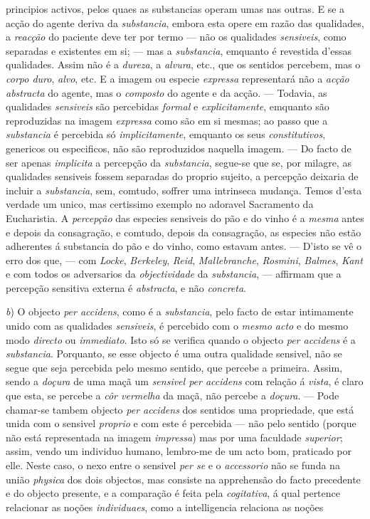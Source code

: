 principios activos, pelos quaes as substancias operam umas nas outras. E se a acção do agente deriva da \emph{substancia}, embora esta opere em razão das qualidades, a \emph{reacção} do paciente deve ter por termo --- não os qualidades \emph{sensiveis}, como separadas e existentes em si; --- mas a \emph{substancia}, emquanto é revestida d'essas qualidades. Assim não é a \emph{dureza}, a \emph{alvura}, etc., que os sentidos percebem, mas o \emph{corpo duro}, \emph{alvo}, etc. E a imagem ou especie \emph{expressa} representará não a \emph{acção abstracta} do agente, mas o \emph{composto} do agente e da acção. --- Todavia, as qualidades \emph{sensiveis} são percebidas \emph{formal} e \emph{explicitamente}, emquanto são reproduzidas na imagem \emph{expressa} como são em si mesmas; ao passo que a \emph{substancia} é percebida só \emph{implicitamente}, emquanto os seus \emph{constitutivos}, genericos ou especificos, não são reproduzidos naquella imagem. --- Do facto de ser apenas \emph{implicita} a percepção da \emph{substancia}, segue-se que se, por milagre, as qualidades sensiveis fossem separadas do proprio sujeito, a percepção deixaria de incluir a \emph{substancia}, sem, comtudo, soffrer uma intrinseca mudança. Temos d'esta verdade um unico, mas certissimo exemplo no adoravel Sacramento da Eucharistia. A \emph{percepção} das especies sensiveis do pão e do vinho é a \emph{mesma} antes e depois da consagração, e comtudo, depois da consagração, as especies não estão adherentes á substancia do pão e do vinho, como estavam antes. --- D'isto se vê o erro dos que, --- com \emph{Locke}, \emph{Berkeley}, \emph{Reid}, \emph{Mallebranche}, \emph{Rosmini}, \emph{Balmes}, \emph{Kant} e com todos os adversarios da \emph{objectividade} da \emph{substancia}, --- affirmam que a percepção sensitiva externa é \emph{abstracta}, e não \emph{concreta}.\par \emph{b}) O objecto \emph{per accidens}, como é a \emph{substancia}, pelo facto de estar intimamente unido com as qualidades \emph{sensiveis}, é percebido com o \emph{mesmo acto} e do mesmo modo \emph{directo} ou \emph{immediato}. Isto só se verifica quando o objecto \emph{per accidens} é a \emph{substancia}. Porquanto, se esse objecto é uma outra qualidade sensivel, não se segue que seja percebida pelo mesmo sentido, que percebe a primeira. Assim, sendo a \emph{doçura} de uma maçã um \emph{sensivel per accidens} com relação á \emph{vista}, é claro que esta, se percebe a \emph{côr vermelha} da maçã, não percebe a \emph{doçura}. --- Pode chamar-se tambem objecto \emph{per accidens} dos sentidos uma propriedade, que está unida com o sensivel \emph{proprio} e com este é percebida --- não pelo sentido (porque não está representada na imagem \emph{impressa}) mas por uma faculdade \emph{superior}; assim, vendo um individuo humano, lembro-me de um acto bom, praticado por elle. Neste caso, o nexo entre o sensivel \emph{per se} e o \emph{accessorio} não se funda na união \emph{physica} dos dois objectos, mas consiste na apprehensão do facto precedente e do objecto presente, e a comparação é feita pela \emph{cogitativa}, á qual pertence relacionar as noções \emph{individuaes}, como a intelligencia relaciona as noções 